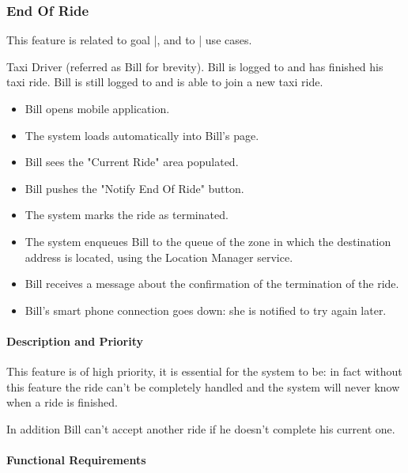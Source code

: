 \subsubsection{End Of Ride}
This feature is related to goal |, and to | use cases.
\begin{itemize}
	 Taxi Driver (referred as Bill for brevity).
	 Bill is logged to \myTaxiService{} and has finished his taxi ride.
	 Bill is still logged to \myTaxiService{} and is able to join a new taxi ride.
	\begin{itemize}
		\item Bill opens \myTaxiService{} mobile application.
		\item The system loads automatically into Bill's page.
		\item Bill sees the "Current Ride" area populated.
		\item Bill pushes the "Notify End Of Ride" button.
		\item The system marks the ride as terminated.
		\item The system enqueues Bill to the queue of the zone in which the destination address is located, using the Location Manager service.
		\item Bill receives a message about the confirmation of the termination of the ride. 
	\end{itemize}
	\begin{itemize}
		\item Bill's smart phone connection goes down: she is notified to try again later.
	\end{itemize}
\end{itemize}
\paragraph{Description and Priority}
This feature is of high priority, it is essential for the system to be: in fact without this feature the ride can't be completely handled and the system will never know when a ride is finished.\par In addition Bill can't accept another ride if he doesn't complete his current one.
\paragraph{Functional Requirements}
\begin{itemize}
\end{itemize}
